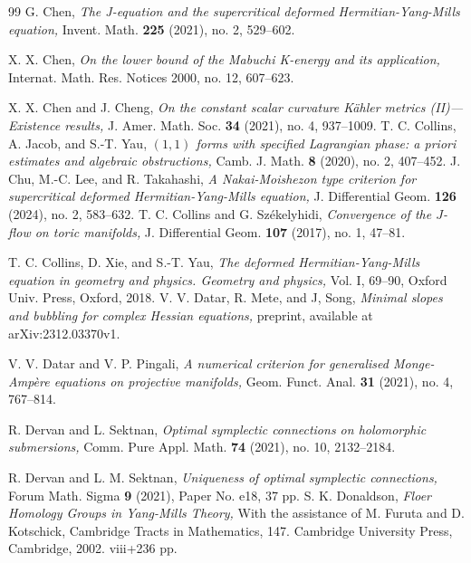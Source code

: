 \documentclass{amsart}
\numberwithin{equation}{section}
\theoremstyle{plain}
\theoremstyle{definition}
\theoremstyle{remark}
\begin{document}
\begin{thebibliography}{99}
  G. Chen,
  \textit{The J-equation and the supercritical deformed Hermitian-Yang-Mills equation,}
  Invent. Math. \textbf{225} (2021), no. 2, 529--602.
 
   X. X. Chen,
   \textit{On the lower bound of the Mabuchi K-energy and its application,}
   Internat. Math. Res. Notices 2000, no. 12, 607--623.

  X. X. Chen and J. Cheng,
  \textit{On the constant scalar curvature Kähler metrics (II)—Existence results,} 
  J. Amer. Math. Soc. \textbf{34} (2021), no. 4, 937--1009.
  T. C. Collins, A. Jacob, and S.-T. Yau, 
  \textit{$(1,1)$ forms with specified Lagrangian phase: a priori estimates and algebraic obstructions,}
  Camb. J. Math. \textbf{8} (2020), no. 2, 407--452.
  J. Chu, M.-C. Lee, and R. Takahashi, 
  \textit{A Nakai-Moishezon type criterion for supercritical deformed Hermitian-Yang-Mills equation,} 
  J. Differential Geom. \textbf{126} (2024), no. 2, 583--632.
  T. C. Collins and G. Sz{\'e}kelyhidi, 
  \textit{Convergence of the $J$-flow on toric manifolds,} 
  J. Differential Geom. \textbf{107} (2017), no. 1, 47--81.
  
  T. C. Collins, D. Xie, and S.-T. Yau, 
  \textit{The deformed Hermitian-Yang-Mills equation in geometry and physics. Geometry and physics,} 
  Vol. I, 69--90, Oxford Univ. Press, Oxford, 2018.
  V. V. Datar, R. Mete, and J, Song,
  \textit{Minimal slopes and bubbling for complex Hessian equations,}
  preprint, available at arXiv:2312.03370v1.
 
   V. V. Datar and V. P. Pingali,
   \textit{A numerical criterion for generalised Monge-Ampère equations on projective manifolds,}
   Geom. Funct. Anal. \textbf{31} (2021), no. 4, 767--814.

  R. Dervan and L. Sektnan,
  \textit{Optimal symplectic connections on holomorphic submersions,}
  Comm. Pure Appl. Math. \textbf{74} (2021), no. 10, 2132--2184.
  
  R. Dervan and L. M. Sektnan, 
  \textit{Uniqueness of optimal symplectic connections,} 
  Forum Math. Sigma \textbf{9} (2021), Paper No. e18, 37 pp.  
  S. K. Donaldson,
  \textit{Floer Homology Groups in Yang-Mills Theory,}
  With the assistance of M. Furuta and D. Kotschick,
  Cambridge Tracts in Mathematics, 147. Cambridge University Press, Cambridge, 2002. viii+236 pp.
  

\end{thebibliography}
\end{document}

